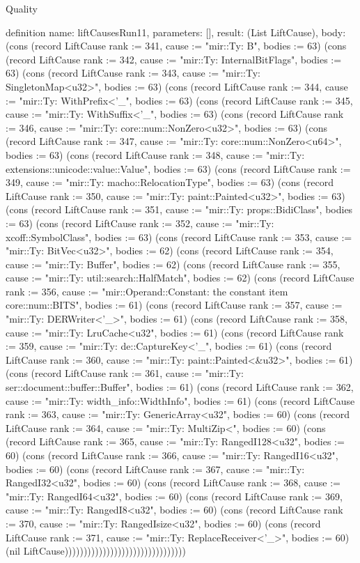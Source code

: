 \begin{lexlean}{Quality}
\begin{semanticmodule}
definition{
  name: liftCausesRun11,
  parameters: [],
  result: (List LiftCause),
  body: (cons (record LiftCause {rank := 341, cause := "mir::Ty: B", bodies := 63}) (cons (record LiftCause {rank := 342, cause := "mir::Ty: InternalBitFlags", bodies := 63}) (cons (record LiftCause {rank := 343, cause := "mir::Ty: SingletonMap<u32>", bodies := 63}) (cons (record LiftCause {rank := 344, cause := "mir::Ty: WithPrefix<'_", bodies := 63}) (cons (record LiftCause {rank := 345, cause := "mir::Ty: WithSuffix<'_", bodies := 63}) (cons (record LiftCause {rank := 346, cause := "mir::Ty: core::num::NonZero<u32>", bodies := 63}) (cons (record LiftCause {rank := 347, cause := "mir::Ty: core::num::NonZero<u64>", bodies := 63}) (cons (record LiftCause {rank := 348, cause := "mir::Ty: extensions::unicode::value::Value", bodies := 63}) (cons (record LiftCause {rank := 349, cause := "mir::Ty: macho::RelocationType", bodies := 63}) (cons (record LiftCause {rank := 350, cause := "mir::Ty: paint::Painted<u32>", bodies := 63}) (cons (record LiftCause {rank := 351, cause := "mir::Ty: props::BidiClass", bodies := 63}) (cons (record LiftCause {rank := 352, cause := "mir::Ty: xcoff::SymbolClass", bodies := 63}) (cons (record LiftCause {rank := 353, cause := "mir::Ty: BitVec<u32>", bodies := 62}) (cons (record LiftCause {rank := 354, cause := "mir::Ty: Buffer", bodies := 62}) (cons (record LiftCause {rank := 355, cause := "mir::Ty: util::search::HalfMatch", bodies := 62}) (cons (record LiftCause {rank := 356, cause := "mir::Operand::Constant: the constant item core::num::BITS", bodies := 61}) (cons (record LiftCause {rank := 357, cause := "mir::Ty: DERWriter<'_>", bodies := 61}) (cons (record LiftCause {rank := 358, cause := "mir::Ty: LruCache<u32", bodies := 61}) (cons (record LiftCause {rank := 359, cause := "mir::Ty: de::CaptureKey<'_", bodies := 61}) (cons (record LiftCause {rank := 360, cause := "mir::Ty: paint::Painted<&u32>", bodies := 61}) (cons (record LiftCause {rank := 361, cause := "mir::Ty: ser::document::buffer::Buffer", bodies := 61}) (cons (record LiftCause {rank := 362, cause := "mir::Ty: width_info::WidthInfo", bodies := 61}) (cons (record LiftCause {rank := 363, cause := "mir::Ty: GenericArray<u32", bodies := 60}) (cons (record LiftCause {rank := 364, cause := "mir::Ty: MultiZip<", bodies := 60}) (cons (record LiftCause {rank := 365, cause := "mir::Ty: RangedI128<u32", bodies := 60}) (cons (record LiftCause {rank := 366, cause := "mir::Ty: RangedI16<u32", bodies := 60}) (cons (record LiftCause {rank := 367, cause := "mir::Ty: RangedI32<u32", bodies := 60}) (cons (record LiftCause {rank := 368, cause := "mir::Ty: RangedI64<u32", bodies := 60}) (cons (record LiftCause {rank := 369, cause := "mir::Ty: RangedI8<u32", bodies := 60}) (cons (record LiftCause {rank := 370, cause := "mir::Ty: RangedIsize<u32", bodies := 60}) (cons (record LiftCause {rank := 371, cause := "mir::Ty: ReplaceReceiver<'_>", bodies := 60}) (nil LiftCause))))))))))))))))))))))))))))))))
}


\end{semanticmodule}
\end{lexlean}
